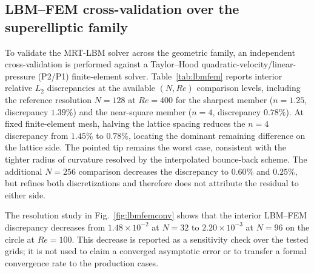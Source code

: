 \documentclass[11pt]{article}
\begin{document}
\par


\subsection{LBM--FEM cross-validation over the superelliptic family}
\label{sec:solverc}

To validate the MRT-LBM solver across the geometric family, an independent cross-validation is performed against a Taylor--Hood quadratic-velocity/linear-pressure (P2/P1) finite-element solver. Table~\ref{tab:lbmfem} reports interior relative $L_2$ discrepancies at the available $(N,Re)$ comparison levels, including the reference resolution $N=128$ at $Re=400$ for the sharpest
member ($n=1.25$, discrepancy $1.39\%$) and the near-square member ($n=4$,
discrepancy $0.78\%$). At fixed finite-element mesh, halving the lattice spacing
reduces the $n=4$ discrepancy from $1.45\%$ to $0.78\%$, locating the dominant
remaining difference on the lattice side. The pointed tip remains the worst
case, consistent with the tighter radius of curvature resolved by the
interpolated bounce-back scheme. The additional $N=256$ comparison decreases the
discrepancy to $0.60\%$ and $0.25\%$, but refines both discretizations and
therefore does not attribute the residual to either side.

The resolution study in Fig.~\ref{fig:lbmfemconv} shows that the interior LBM--FEM discrepancy decreases from $1.48\times10^{-2}$ at $N=32$ to $2.20\times10^{-3}$ at $N=96$ on the circle at $Re=100$. This decrease is reported as a sensitivity check over the tested grids; it is not used to claim a converged asymptotic error or to transfer a formal convergence rate to the production cases.
\end{document}
